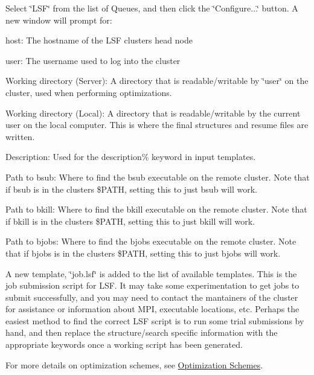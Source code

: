 Select \char`\"{}\+L\+S\+F\char`\"{} from the list of Queues, and then click the \char`\"{}\+Configure...\char`\"{} button. A new window will prompt for\+:
\begin{DoxyItemize}
\item host\+: The hostname of the L\+S\+F cluster\textquotesingle{}s head node
\item user\+: The username used to log into the cluster
\item Working directory (Server)\+: A directory that is readable/writable by \char`\"{}user\char`\"{} on the cluster, used when performing optimizations.
\item Working directory (Local)\+: A directory that is readable/writable by the current user on the local computer. This is where the final structures and resume files are written.
\begin{DoxyItemize}
\item Description\+: Used for the description\% keyword in input templates.
\item Path to bsub\+: Where to find the bsub executable on the remote cluster. Note that if bsub is in the cluster\textquotesingle{}s \$\+P\+A\+T\+H, setting this to just \textquotesingle{}bsub\textquotesingle{} will work.
\item Path to bkill\+: Where to find the bkill executable on the remote cluster. Note that if bkill is in the cluster\textquotesingle{}s \$\+P\+A\+T\+H, setting this to just \textquotesingle{}bkill\textquotesingle{} will work.
\item Path to bjobs\+: Where to find the bjobs executable on the remote cluster. Note that if bjobs is in the cluster\textquotesingle{}s \$\+P\+A\+T\+H, setting this to just \textquotesingle{}bjobs\textquotesingle{} will work.
\end{DoxyItemize}
\end{DoxyItemize}

A new template, \char`\"{}job.\+lsf\char`\"{} is added to the list of available templates. This is the job submission script for L\+S\+F. It may take some experimentation to get jobs to submit successfully, and you may need to contact the mantainers of the cluster for assistance or information about M\+P\+I, executable locations, etc. Perhaps the easiest method to find the correct L\+S\+F script is to run some trial submissions by hand, and then replace the structure/search specific information with the appropriate keywords once a working script has been generated.

For more details on optimization schemes, see \hyperlink{optschemes}{Optimization Schemes}.

